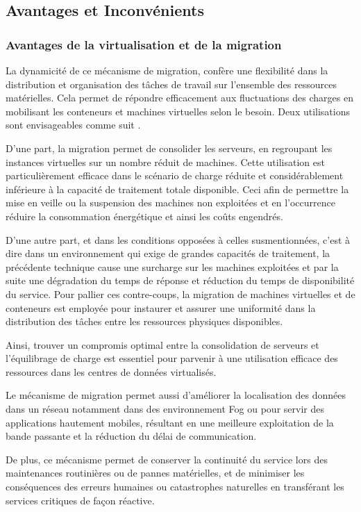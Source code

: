 \subsection{Avantages et Inconvénients}
\subsubsection{Avantages de la virtualisation et de la migration}
La dynamicité de ce mécanisme de migration, confère une flexibilité dans la distribution et organisation des tâches de travail sur l'ensemble des ressources matérielles. Cela permet de répondre efficacement aux fluctuations des charges en mobilisant les conteneurs et machines virtuelles selon le besoin. Deux utilisations sont envisageables comme suit \cite{boutaba2013}.\par
D'une part, la migration permet de consolider les serveurs, en regroupant les instances virtuelles sur un nombre réduit de machines. Cette utilisation est particulièrement efficace dans le scénario de charge réduite et considérablement inférieure à la capacité de traitement totale disponible. Ceci afin de permettre la mise en veille ou la suspension des machines non exploitées et en l'occurrence réduire la consommation énergétique et ainsi les coûts engendrés.\par
D'une autre part, et dans les conditions opposées à celles susmentionnées, c'est à dire dans un environnement qui exige de grandes capacités de traitement, la précédente technique cause une surcharge sur les machines exploitées et par la suite une dégradation du temps de réponse et réduction du temps de disponibilité du service. Pour pallier ces contre-coups, la migration de machines virtuelles et de conteneurs est employée pour instaurer et assurer une uniformité dans la distribution des tâches entre les ressources physiques disponibles.\par
Ainsi, trouver un compromis optimal entre la consolidation de serveurs et l'équilibrage de charge est essentiel pour parvenir à une utilisation efficace des ressources dans les centres de données virtualisés.\par
Le mécanisme de migration permet aussi d'améliorer la localisation des données dans un réseau notamment dans des environnement Fog ou pour servir des applications hautement mobiles, résultant en une meilleure exploitation de la bande passante et la réduction du délai de communication.\par
De plus, ce mécanisme permet de conserver la continuité du service lors des maintenances routinières ou de pannes matérielles, et de minimiser les conséquences des erreurs humaines ou catastrophes naturelles en transférant les services critiques de façon réactive.
